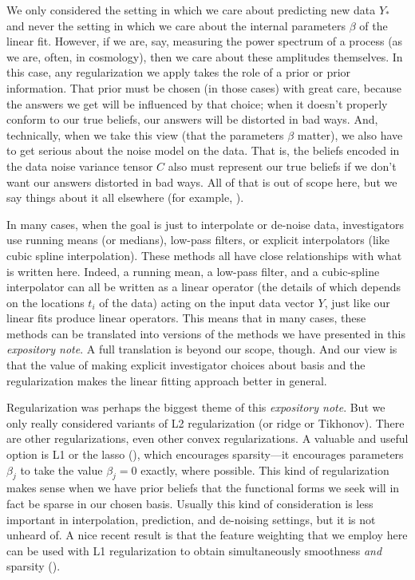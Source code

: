 \documentclass[12pt,letterpaper]{article}
\newcommand{\documentname}{\textsl{expository note}}
\begin{document}
We only considered the setting in which we care about predicting new data $Y_\ast$ and never the setting in which we care about the internal parameters $\beta$ of the linear fit.
However, if we are, say, measuring the power spectrum of a process (as we are, often, in cosmology), then we care about these amplitudes themselves.
In this case, any regularization we apply takes the role of a prior or prior information.
That prior must be chosen (in those cases) with great care, because the answers we get will be influenced by that choice; when it doesn't properly conform to our true beliefs, our answers will be distorted in bad ways.
And, technically, when we take this view (that the parameters $\beta$ matter), we also have to get serious about the noise model on the data.
That is, the beliefs encoded in the data noise variance tensor $C$ also must represent our true beliefs if we don't want our answers distorted in bad ways.
All of that is out of scope here, but we say things about it all elsewhere (for example, \citealt{fitting}).

In many cases, when the goal is just to interpolate or de-noise data, investigators use running means (or medians), low-pass filters, or explicit interpolators (like cubic spline interpolation).
These methods all have close relationships with what is written here.
Indeed, a running mean, a low-pass filter, and a cubic-spline interpolator can all be written as a linear operator (the details of which depends on the locations $t_i$ of the data) acting on the input data vector $Y$, just like our linear fits produce linear operators.
This means that in many cases, these methods can be translated into versions of the methods we have presented in this \documentname.
A full translation is beyond our scope, though.
And our view is that the value of making explicit investigator choices about basis and the regularization makes the linear fitting approach better in general.

Regularization was perhaps the biggest theme of this \documentname.
But we only really considered variants of L2 regularization (or ridge or Tikhonov).
There are other regularizations, even other convex regularizations.
A valuable and useful option is L1 or the lasso (\citealt{lasso}), which encourages sparsity---it encourages parameters $\beta_j$ to take the value $\beta_j=0$ exactly, where possible.
This kind of regularization makes sense when we have prior beliefs that the functional forms we seek will in fact be sparse in our chosen basis.
Usually this kind of consideration is less important in interpolation, prediction, and de-noising settings, but it is not unheard of.
A nice recent result is that the feature weighting that we employ here can be used with L1 regularization to obtain simultaneously smoothness \emph{and} sparsity (\citealt{rauhut2016interpolation}).
\end{document}
